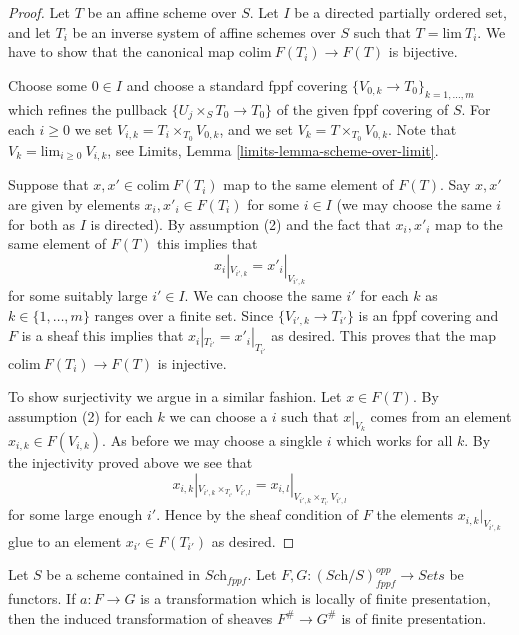 \begin{proof}
Let $T$ be an affine scheme over $S$.
Let $I$ be a directed partially ordered set, and let
$T_i$ be an inverse system of affine schemes over $S$ such that
$T = \text{lim}\ T_i$. We have to show that the canonical
map $\text{colim}\ F(T_i) \to F(T)$ is bijective.

\medskip\noindent
Choose some $0 \in I$ and choose a standard fppf covering
$\{V_{0, k} \to T_{0}\}_{k = 1, \ldots, m}$ which refines
the pullback $\{U_j \times_S T_0 \to T_0\}$ of the given fppf covering of $S$.
For each $i \geq 0$ we set $V_{i, k} = T_i \times_{T_0} V_{0, k}$, and
we set $V_k = T \times_{T_0} V_{0, k}$. Note that
$V_k = \text{lim}_{i \geq 0}\ V_{i, k}$, see
Limits, Lemma \ref{limits-lemma-scheme-over-limit}.

\medskip\noindent
Suppose that $x, x' \in \text{colim}\ F(T_i)$ map to the same
element of $F(T)$. Say $x, x'$ are given by elements $x_i, x'_i \in F(T_i)$
for some $i \in I$ (we may choose the same $i$ for both as $I$ is directed).
By assumption (2) and the fact that $x_i, x'_i$ map to the same element
of $F(T)$ this implies that
$$
x_i|_{V_{i', k}} = x'_i|_{V_{i', k}}
$$
for some suitably large $i' \in I$. We can choose the same $i'$ for each
$k$ as $k \in \{1, \ldots, m\}$ ranges over a finite set.
Since $\{V_{i', k} \to T_{i'}\}$
is an fppf covering and $F$ is a sheaf this implies that
$x_i|_{T_{i'}} = x'_i|_{T_{i'}}$ as desired. This proves that the map
$\text{colim}\ F(T_i) \to F(T)$ is injective.

\medskip\noindent
To show surjectivity we argue in a similar fashion.
Let $x \in F(T)$. By assumption (2) for each $k$ we
can choose a $i$ such that $x|_{V_k}$ comes from an
element $x_{i, k} \in F(V_{i, k})$. As before we may choose a
singkle $i$ which works for all $k$. By the injectivity
proved above we see that
$$
x_{i, k}|_{V_{i', k} \times_{T_{i'}} V_{i', l}}
=
x_{i, l}|_{V_{i', k} \times_{T_{i'}} V_{i', l}}
$$
for some large enough $i'$. Hence by the sheaf condition of $F$
the elements $x_{i, k}|_{V_{i', k}}$ glue to an element $x_{i'} \in F(T_{i'})$
as desired.
\end{proof}

\begin{lemma}
\label{lemma-sheafify-finite-presentation-map}
Let $S$ be a scheme contained in $\textit{Sch}_{fppf}$.
Let $F, G : (\textit{Sch}/S)_{fppf}^{opp} \to \textit{Sets}$ be functors.
If $a : F \to G$ is a transformation which is locally of finite
presentation, then the induced transformation of sheaves
$F^\# \to G^\#$ is of finite presentation.
\end{lemma}

